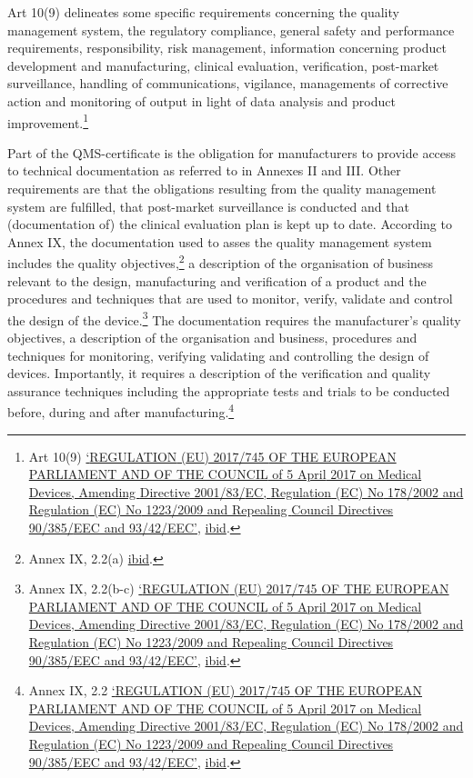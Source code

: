 \documentclass[
]{scrartcl}
\begin{document}
Art 10(9) delineates some specific requirements concerning the quality management system, the regulatory compliance, general safety and performance requirements, responsibility, risk management, information concerning product development and manufacturing, clinical evaluation, verification, post-market surveillance, handling of communications, vigilance, managements of corrective action and monitoring of output in light of data analysis and product improvement.\footnote{Art 10(9) \protect\hyperlink{ref-REGULATIONEU2017a}{{`{REGULATION} ({EU}) 2017/745 {OF THE EUROPEAN PARLIAMENT AND OF THE COUNCIL} of 5 {April} 2017 on Medical Devices, Amending {Directive} 2001/83/{EC}, {Regulation} ({EC}) {No} 178/2002 and {Regulation} ({EC}) {No} 1223/2009 and Repealing {Council Directives} 90/385/{EEC} and 93/42/{EEC}'}}, \protect\hyperlink{ref-REGULATIONEU2017a}{ibid}.}

Part of the QMS-certificate is the obligation for manufacturers to provide access to technical documentation as referred to in Annexes II and III. Other requirements are that the obligations resulting from the quality management system are fulfilled, that post-market surveillance is conducted and that (documentation of) the clinical evaluation plan is kept up to date. According to Annex IX, the documentation used to asses the quality management system includes the quality objectives,\footnote{Annex IX, 2.2(a) \protect\hyperlink{ref-REGULATIONEU2017a}{ibid}.} a description of the organisation of business relevant to the design, manufacturing and verification of a product and the procedures and techniques that are used to monitor, verify, validate and control the design of the device.\footnote{Annex IX, 2.2(b-c) \protect\hyperlink{ref-REGULATIONEU2017a}{{`{REGULATION} ({EU}) 2017/745 {OF THE EUROPEAN PARLIAMENT AND OF THE COUNCIL} of 5 {April} 2017 on Medical Devices, Amending {Directive} 2001/83/{EC}, {Regulation} ({EC}) {No} 178/2002 and {Regulation} ({EC}) {No} 1223/2009 and Repealing {Council Directives} 90/385/{EEC} and 93/42/{EEC}'}}, \protect\hyperlink{ref-REGULATIONEU2017a}{ibid}.} The documentation requires the manufacturer's quality objectives, a description of the organisation and business, procedures and techniques for monitoring, verifying validating and controlling the design of devices. Importantly, it requires a description of the verification and quality assurance techniques including the appropriate tests and trials to be conducted before, during and after manufacturing.\footnote{Annex IX, 2.2 \protect\hyperlink{ref-REGULATIONEU2017a}{{`{REGULATION} ({EU}) 2017/745 {OF THE EUROPEAN PARLIAMENT AND OF THE COUNCIL} of 5 {April} 2017 on Medical Devices, Amending {Directive} 2001/83/{EC}, {Regulation} ({EC}) {No} 178/2002 and {Regulation} ({EC}) {No} 1223/2009 and Repealing {Council Directives} 90/385/{EEC} and 93/42/{EEC}'}}, \protect\hyperlink{ref-REGULATIONEU2017a}{ibid}.}
\end{document}
